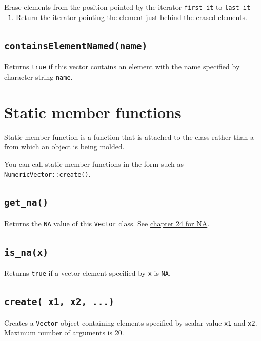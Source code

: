\documentclass[]{book}
\begin{document}
Erase elements from the position pointed by the iterator \texttt{first\_it} to \texttt{last\_it\ -\ 1}. Return the iterator pointing the element just behind the erased elements.

\hypertarget{containselementnamedname}{%
\subsection{\texorpdfstring{\texttt{containsElementNamed(name)}}{containsElementNamed(name)}}\label{containselementnamedname}}

Returns \texttt{true} if this vector contains an element with the name specified by character string \texttt{name}.

\hypertarget{static-member-functions}{%
\section{Static member functions}\label{static-member-functions}}

Static member function is a function that is attached to the class rather than a from which an object is being molded.

You can call static member functions in the form such as \texttt{NumericVector::create()}.

\hypertarget{get_na}{%
\subsection{\texorpdfstring{\texttt{get\_na()}}{get\_na()}}\label{get_na}}

Returns the \texttt{NA} value of this \texttt{Vector} class. See \href{240_na_nan_inf.html}{chapter 24 for NA}.

\hypertarget{is_nax}{%
\subsection{\texorpdfstring{\texttt{is\_na(x)}}{is\_na(x)}}\label{is_nax}}

Returns \texttt{true} if a vector element specified by \texttt{x} is \texttt{NA}.

\hypertarget{create-x1-x2-...}{%
\subsection{\texorpdfstring{\texttt{create(\ x1,\ x2,\ ...)}}{create( x1, x2, ...)}}\label{create-x1-x2-...}}

Creates a \texttt{Vector} object containing elements specified by scalar value \texttt{x1} and \texttt{x2}. Maximum number of arguments is 20.
\end{document}
